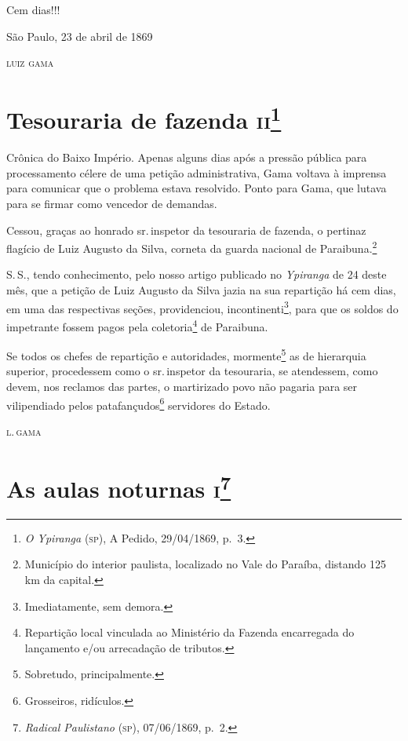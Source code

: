 Cem dias!!!

\begin{flushright}
São Paulo, 23 de abril de 1869

\textsc{luiz gama}
\end{flushright}

\chapter{Tesouraria de fazenda \textsc{ii}\footnote{\emph{O Ypiranga}
  (\textsc{sp}), A Pedido, 29/04/1869, p.~3.}}

\begin{didascalia}
Crônica do Baixo Império. Apenas alguns dias após a pressão pública para
processamento célere de uma petição administrativa, Gama voltava à
imprensa para comunicar que o problema estava resolvido. Ponto para
Gama, que lutava para se firmar como vencedor de demandas.
\end{didascalia}


Cessou, graças ao honrado sr.\,inspetor da tesouraria de fazenda, o
pertinaz flagício de Luiz Augusto da Silva, corneta da guarda nacional
de Paraibuna.\footnote{Município do interior paulista, localizado no
  Vale do Paraíba, distando 125 km da capital.}

S.\,S., tendo conhecimento, pelo nosso artigo publicado no
\emph{Ypiranga} de 24 deste mês, que a petição de Luiz Augusto da Silva
jazia na sua repartição há cem dias, em uma das respectivas seções,
providenciou, incontinenti\footnote{Imediatamente, sem demora.}, para
que os soldos do impetrante fossem pagos pela coletoria\footnote{
  Repartição local vinculada ao Ministério da Fazenda encarregada do
  lançamento e/ou arrecadação de tributos.} de Paraibuna.

Se todos os chefes de repartição e autoridades, mormente\footnote{
  Sobretudo, principalmente.} as de hierarquia superior, procedessem
como o sr.\,inspetor da tesouraria, se atendessem, como devem, nos
reclamos das partes, o martirizado povo não pagaria para ser
vilipendiado pelos patafançudos\footnote{Grosseiros, ridículos.}
servidores do Estado.

\begin{flushright}
\textsc{l.\,gama}
\end{flushright}

\chapter{As aulas noturnas \textsc{i}\footnote{\emph{Radical Paulistano}
  (\textsc{sp}), 07/06/1869, p.~2.}}

